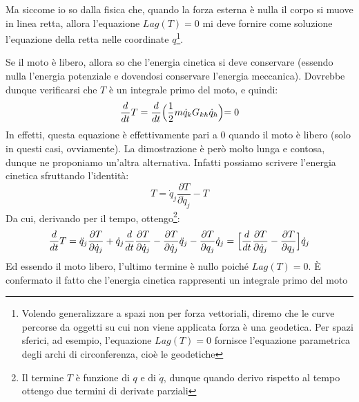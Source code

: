 \documentclass[a4paper,openany]{article}
\begin{document}
	Ma siccome io so dalla fisica che, quando la forza esterna è nulla il corpo si muove in linea retta, allora l'equazione $Lag(T)=0$ mi deve fornire come soluzione l'equazione della retta nelle coordinate $q$\footnote{Volendo generalizzare a spazi non per forza vettoriali, diremo che le curve percorse da oggetti su cui non viene applicata forza è una geodetica. Per spazi sferici, ad esempio, l'equazione $Lag(T)=0$ fornisce l'equazione parametrica degli archi di circonferenza, cioè le geodetiche}.
	
	Se il moto è libero, allora so che l'energia cinetica si deve conservare (essendo nulla l'energia potenziale e dovendosi conservare l'energia meccanica). Dovrebbe dunque verificarsi che $T$ è un integrale primo del moto, e quindi:
	$$
	\dfrac{d}{dt}T = \dfrac{d}{dt}\Bigl(\dfrac{1}{2}m\dot{q}_{k}G_{kh}\dot{q}_{h}\Bigl) = 0
	$$
	In effetti, questa equazione è effettivamente pari a 0 quando il moto è libero (solo in questi casi, ovviamente). La dimostrazione è però molto lunga e contosa, dunque ne proponiamo un'altra alternativa. Infatti possiamo scrivere l'energia cinetica sfruttando l'identità:
	$$
	T = \dot{q}_{j}\dfrac{\partial T}{\partial \dot{q}_{j}} - T
	$$
	Da cui, derivando per il tempo, ottengo\footnote{Il termine $T$ è funzione di $q \mbox{ e di }\dot{q}$, dunque quando derivo rispetto al tempo ottengo due termini di derivate parziali}:
	$$
	\dfrac{d}{dt}T = \ddot{q}_{j}\dfrac{\partial T}{\partial \dot{q}_{j}} + \dot{q}_{j}\dfrac{d}{dt}\dfrac{\partial T}{\partial \dot{q}_{j}} - \dfrac{\partial T}{\partial \dot{q}_{j}}\ddot{q}_{j} -\dfrac{\partial T}{\partial q_{j}}\dot{q}_{j} = \Bigl[\dfrac{d}{dt}\dfrac{\partial T}{\partial \dot{q}_{j}}-\dfrac{\partial T}{\partial q_{j}}\Bigl]\dot{q}_{j}
	$$
	Ed essendo il moto libero, l'ultimo termine è nullo poiché $Lag(T) = 0$. È confermato il fatto che l'energia cinetica rappresenti un integrale primo del moto
	
\end{document}

